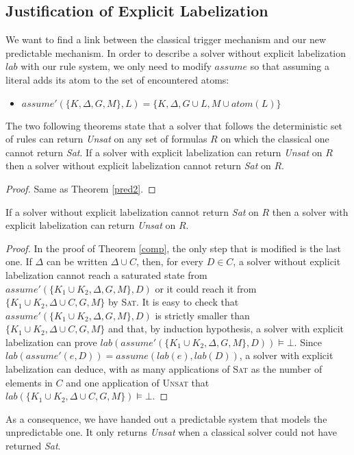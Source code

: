 \documentclass[a4paper,11pt]{article}
\newcommand{\atom}{\mathit{atom}}
\newcommand{\T}{\mathit{lab}}
\newcommand{\A}{\mathit{assume}}
\newcommand{\impbox}{\vDash\bot}
\begin{document}
\subsection{Justification of Explicit Labelization}
We want to find a link between the classical trigger mechanism and our new predictable mechanism.
In order to describe a solver without explicit labelization $\T$ with our rule system,
we only need to modify $\A$ so that
assuming a literal adds its atom to the set of encountered atoms:
\begin{itemize}
 \item $\A'(\{K,\Delta,G,M\},L)=\{K,\Delta,G\cup L,M\cup\atom(L)\}$
\end{itemize}

The two following theorems state that a solver that follows the deterministic set of rules can return
\emph{Unsat} on any set of formulas $R$ on which the classical one cannot return \emph{Sat}.
{\theorem If a solver with explicit labelization can return \emph{Unsat} on $R$ then
a solver without explicit labelization cannot return \emph{Sat} on $R$.}
\begin{proof}
Same as Theorem \ref{pred2}.
\end{proof}

{\theorem If a solver without explicit labelization cannot return \emph{Sat} on $R$ then
a solver with explicit labelization can return \emph{Unsat} on $R$.}
\begin{proof}
In the proof of Theorem \ref{comp}, the only step that is modified is the last one.
If $\Delta$ can be written $\Delta\cup C$, then, for every $D\in C$, a solver without explicit labelization
cannot reach a saturated state from $\A'(\{K_1\cup K_2,\Delta,G,M\},D)$ or it could
reach it from $\{K_1\cup K_2,\Delta\cup C,G,M\}$ by \textsc{Sat}.
It is easy to check that 
$\A'(\{K_1\cup K_2,\Delta,G,M\},D)$ is strictly smaller than $\{K_1\cup K_2,\Delta\cup C,G,M\}$
and that, by induction hypothesis, a solver with explicit labelization can prove
$\T(\A'(\{K_1\cup K_2,\Delta,G,M\},D))\impbox$. Since
$\T(\A'(e,D))=\A(\T(e),\T(D))$,
a solver with explicit labelization can deduce, with as many applications of \textsc{Sat} as the number
of elements in $C$ and one application of \textsc{Unsat} that
$\T(\{K_1\cup K_2,\Delta\cup C,G,M\})\impbox$.
\end{proof}

As a consequence, we have handed out a predictable system that models the unpredictable one. It only
returns \emph{Unsat} when a classical solver could not have returned \emph{Sat}.
\end{document}
